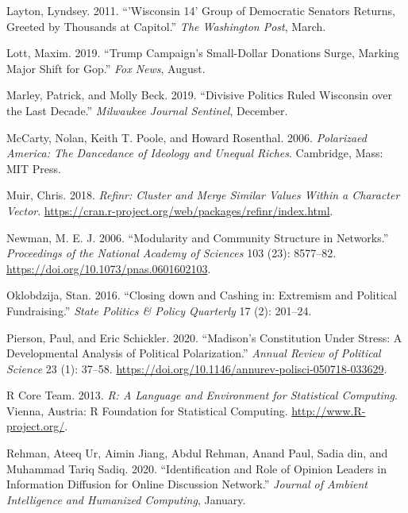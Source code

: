 \documentclass[12pt,]{article}
\begin{document}
\leavevmode\hypertarget{ref-layton2011}{}%
Layton, Lyndsey. 2011. ``'Wisconsin 14' Group of Democratic Senators
Returns, Greeted by Thousands at Capitol.'' \emph{The Washington Post},
March.

\leavevmode\hypertarget{ref-lott2019}{}%
Lott, Maxim. 2019. ``Trump Campaign's Small-Dollar Donations Surge,
Marking Major Shift for Gop.'' \emph{Fox News}, August.

\leavevmode\hypertarget{ref-marley2019}{}%
Marley, Patrick, and Molly Beck. 2019. ``Divisive Politics Ruled
Wisconsin over the Last Decade.'' \emph{Milwaukee Journal Sentinel},
December.

\leavevmode\hypertarget{ref-mccarty2006}{}%
McCarty, Nolan, Keith T. Poole, and Howard Rosenthal. 2006.
\emph{Polarizaed America: The Dancedance of Ideology and Unequal
Riches}. Cambridge, Mass: MIT Press.

\leavevmode\hypertarget{ref-refinr}{}%
Muir, Chris. 2018. \emph{Refinr: Cluster and Merge Similar Values Within
a Character Vector}.
\url{https://cran.r-project.org/web/packages/refinr/index.html}.

\leavevmode\hypertarget{ref-newman2006}{}%
Newman, M. E. J. 2006. ``Modularity and Community Structure in
Networks.'' \emph{Proceedings of the National Academy of Sciences} 103
(23): 8577--82. \url{https://doi.org/10.1073/pnas.0601602103}.

\leavevmode\hypertarget{ref-oklobzija}{}%
Oklobdzija, Stan. 2016. ``Closing down and Cashing in: Extremism and
Political Fundraising.'' \emph{State Politics \& Policy Quarterly} 17
(2): 201--24.

\leavevmode\hypertarget{ref-pierson2020}{}%
Pierson, Paul, and Eric Schickler. 2020. ``Madison's Constitution Under
Stress: A Developmental Analysis of Political Polarization.''
\emph{Annual Review of Political Science} 23 (1): 37--58.
\url{https://doi.org/10.1146/annurev-polisci-050718-033629}.

\leavevmode\hypertarget{ref-r}{}%
R Core Team. 2013. \emph{R: A Language and Environment for Statistical
Computing}. Vienna, Austria: R Foundation for Statistical Computing.
\url{http://www.R-project.org/}.

\leavevmode\hypertarget{ref-rehman2020}{}%
Rehman, Ateeq Ur, Aimin Jiang, Abdul Rehman, Anand Paul, Sadia din, and
Muhammad Tariq Sadiq. 2020. ``Identification and Role of Opinion Leaders
in Information Diffusion for Online Discussion Network.'' \emph{Journal
of Ambient Intelligence and Humanized Computing}, January.
\end{document}

